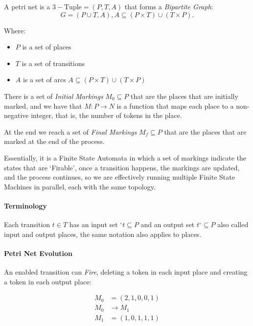 \documentclass[openright, twoside, twocolumn]{report}
\begin{document}
    \begin{definition}
      \label{def:petri-nets}
      A petri net is a $3-\text{Tuple} = (P, T, A)$
      that forms a \emph{Bipartite Graph}:
    \[
      G = (P \cup T, A), A \subseteq (P \times T) \cup (T \times P)
    .\]

    Where:

    \begin{itemize}
      \item $P$ is a set of places
      \item $T$ is a set of transitions
      \item $A$ is a set of arcs $A \subseteq (P \times T) \cup (T \times P)$
    \end{itemize}

    There is a set of \emph{Initial Markings} $M_0 \subseteq P$ that are the places that are initially marked,
    and we have that $M:P \to N$ is a function that maps each place to a non-negative integer, that is, 
    the number of tokens in the place.

    At the end we reach a set of \emph{Final Markings} $M_f \subseteq P$ that are the places that are marked at the end of the process.
    \end{definition}

    Essentially, it is a Finite State Automata in which a set of markings indicate the states that are `Firable', once a transition 
    happens, the markings are updated, and the process continues, so we are effectively running multiple Finite State Machines 
    in parallel, each with the same topology.

    \paragraph{Terminology}
    
    Each transition $t \in  T$  has an input set ${}^{\circ}t \subseteq P$ and an output set $t^{\circ} \subseteq  P$ also called input 
    and output places, the same notation also applies to places.

    \paragraph{Petri Net Evolution}
    
    An enabled transition can \emph{Fire}, deleting a token in each input place and creating a token in each output place:

    \begin{align*}
      M_0 &= \left( 2, 1, 0, 0, 1 \right)\\
      M_0 &\to M_1\\
      M_1 &= \left( 1, 0, 1, 1, 1 \right)
    \end{align*}
\end{document}
